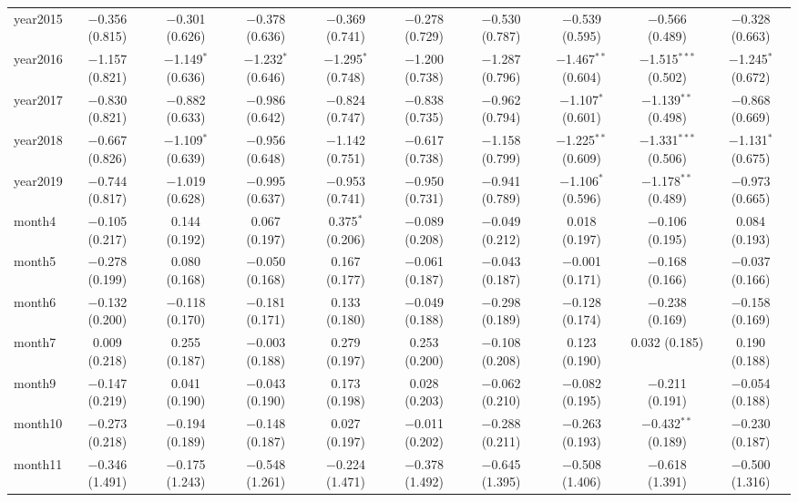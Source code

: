 \begin{table}[!htbp]
\begin{tabular}{@{\extracolsep{1pt}}lccccccccc}
  year2015 & $-$0.356 (0.815) & $-$0.301 (0.626) & $-$0.378 (0.636) & $-$0.369 (0.741) & $-$0.278 (0.729) & $-$0.530 (0.787) & $-$0.539 (0.595) & $-$0.566 (0.489) & $-$0.328 (0.663) \\ 
  year2016 & $-$1.157 (0.821) & $-$1.149$^{*}$ (0.636) & $-$1.232$^{*}$ (0.646) & $-$1.295$^{*}$ (0.748) & $-$1.200 (0.738) & $-$1.287 (0.796) & $-$1.467$^{**}$ (0.604) & $-$1.515$^{***}$ (0.502) & $-$1.245$^{*}$ (0.672) \\ 
  year2017 & $-$0.830 (0.821) & $-$0.882 (0.633) & $-$0.986 (0.642) & $-$0.824 (0.747) & $-$0.838 (0.735) & $-$0.962 (0.794) & $-$1.107$^{*}$ (0.601) & $-$1.139$^{**}$ (0.498) & $-$0.868 (0.669) \\ 
  year2018 & $-$0.667 (0.826) & $-$1.109$^{*}$ (0.639) & $-$0.956 (0.648) & $-$1.142 (0.751) & $-$0.617 (0.738) & $-$1.158 (0.799) & $-$1.225$^{**}$ (0.609) & $-$1.331$^{***}$ (0.506) & $-$1.131$^{*}$ (0.675) \\ 
  year2019 & $-$0.744 (0.817) & $-$1.019 (0.628) & $-$0.995 (0.637) & $-$0.953 (0.741) & $-$0.950 (0.731) & $-$0.941 (0.789) & $-$1.106$^{*}$ (0.596) & $-$1.178$^{**}$ (0.489) & $-$0.973 (0.665) \\ 
  month4 & $-$0.105 (0.217) & 0.144 (0.192) & 0.067 (0.197) & 0.375$^{*}$ (0.206) & $-$0.089 (0.208) & $-$0.049 (0.212) & 0.018 (0.197) & $-$0.106 (0.195) & 0.084 (0.193) \\ 
  month5 & $-$0.278 (0.199) & 0.080 (0.168) & $-$0.050 (0.168) & 0.167 (0.177) & $-$0.061 (0.187) & $-$0.043 (0.187) & $-$0.001 (0.171) & $-$0.168 (0.166) & $-$0.037 (0.166) \\ 
  month6 & $-$0.132 (0.200) & $-$0.118 (0.170) & $-$0.181 (0.171) & 0.133 (0.180) & $-$0.049 (0.188) & $-$0.298 (0.189) & $-$0.128 (0.174) & $-$0.238 (0.169) & $-$0.158 (0.169) \\ 
  month7 & 0.009 (0.218) & 0.255 (0.187) & $-$0.003 (0.188) & 0.279 (0.197) & 0.253 (0.200) & $-$0.108 (0.208) & 0.123 (0.190) & 0.032 (0.185) & 0.190 (0.188) \\ 
  month9 & $-$0.147 (0.219) & 0.041 (0.190) & $-$0.043 (0.190) & 0.173 (0.198) & 0.028 (0.203) & $-$0.062 (0.210) & $-$0.082 (0.195) & $-$0.211 (0.191) & $-$0.054 (0.188) \\ 
  month10 & $-$0.273 (0.218) & $-$0.194 (0.189) & $-$0.148 (0.187) & 0.027 (0.197) & $-$0.011 (0.202) & $-$0.288 (0.211) & $-$0.263 (0.193) & $-$0.432$^{**}$ (0.189) & $-$0.230 (0.187) \\ 
  month11 & $-$0.346 (1.491) & $-$0.175 (1.243) & $-$0.548 (1.261) & $-$0.224 (1.471) & $-$0.378 (1.492) & $-$0.645 (1.395) & $-$0.508 (1.406) & $-$0.618 (1.391) & $-$0.500 (1.316) \\ 

\end{tabular}
\end{table}
